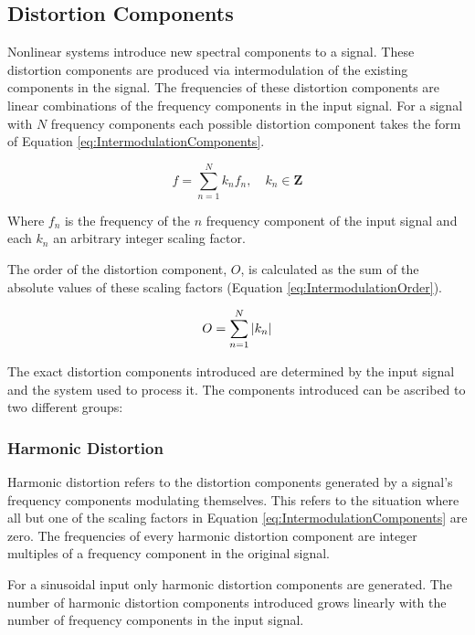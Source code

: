 	\subsection{Distortion Components}
	\label{sec:Excitation-AnalysisOfNonlinearSystems-Components}
		Nonlinear systems introduce new spectral components to a signal. These distortion components are produced
		via intermodulation of the existing components in the signal. The frequencies of these distortion components
		are linear combinations of the frequency components in the input signal. For a signal with $N$ frequency
		components each possible distortion component takes the form of Equation \ref{eq:IntermodulationComponents}.

		\begin{equation}
			f = \sum_{n = 1}^{N} k_{n}f_{n}, \quad k_{n} \in \textbf{Z}
			\label{eq:IntermodulationComponents}
		\end{equation}

		Where $f_{n}$ is the frequency of the $n$ frequency component of the input signal and each $k_{n}$
		an arbitrary integer scaling factor.

		The order of the distortion component, $O$, is calculated as the sum of the absolute values of these scaling
		factors (Equation \ref{eq:IntermodulationOrder}).

		\begin{equation}
			O = \sum_{n = 1}^{N} \left|k_{n}\right|
			\label{eq:IntermodulationOrder}
		\end{equation}

		The exact distortion components introduced are determined by the input signal and the system used to process
		it. The components introduced can be ascribed to two different groups:

		\subsubsection*{Harmonic Distortion}
			Harmonic distortion refers to the distortion components generated by a signal's frequency components
			modulating themselves. This refers to the situation where all but one of the scaling factors in
			Equation \ref{eq:IntermodulationComponents} are zero. The frequencies of every harmonic distortion
			component are integer multiples of a frequency component in the original signal. 
			
			For a sinusoidal input only harmonic distortion components are generated. The number of harmonic
			distortion components introduced grows linearly with the number of frequency components in the input
			signal.

